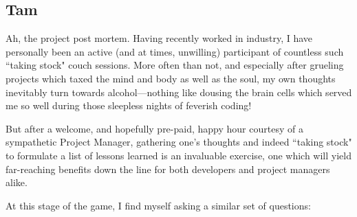 \documentclass[12pt]{report}
\begin{document}
\subsection{Tam}

Ah, the project post mortem. Having recently worked in industry, I have personally been an active (and at times, unwilling) participant of countless such ``taking stock" couch sessions. More often than not, and especially after grueling projects which taxed the mind and body as well as the soul, my own thoughts inevitably turn towards alcohol---nothing like dousing the brain cells which served me so well during those sleepless nights of feverish coding!

But after a welcome, and hopefully pre-paid, happy hour courtesy of a sympathetic Project Manager, gathering one's thoughts and indeed ``taking stock" to formulate a list of lessons learned is an invaluable exercise, one which will yield far-reaching benefits down the line for both developers and project managers alike.

At this stage of the game, I find myself asking a similar set of questions:
\end{document}
